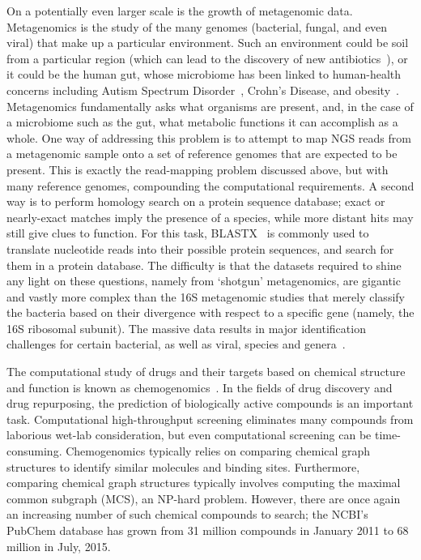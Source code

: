 \documentclass{acm_proc_article-sp}
\begin{document}
On a potentially even larger scale is the growth of metagenomic data.
Metagenomics is the study of the many genomes (bacterial, fungal, and even 
viral) that make up a particular environment.
Such an environment could be soil from a particular region (which can lead to 
the discovery of new 
antibiotics~\cite{forsberg2012shared}), or it could be 
the human gut, whose microbiome has been linked to human-health concerns 
including Autism Spectrum Disorder~\cite{macfabe2012short}, 
Crohn's Disease, and 
obesity~\cite{kostic2014microbiome}.
Metagenomics fundamentally asks what organisms are present, and, in the case
of a microbiome such as the gut, what metabolic functions it can accomplish as
a whole.
One way of addressing this problem is to attempt to map NGS reads from a metagenomic sample
onto a set of reference genomes that are expected to be present.
This is exactly the read-mapping problem discussed above, but with many 
reference genomes, compounding the computational requirements.
A second way is to perform homology search on a protein sequence database;
exact or nearly-exact matches imply the presence of a species, while more 
distant hits may still give clues to function.
For this task, BLASTX~\cite{altschul1990basic} is commonly
used to translate nucleotide reads into their possible protein sequences, and
search for them in a protein database.
The difficulty is that the datasets required to shine any light on these 
questions, namely from `shotgun' metagenomics, are gigantic and vastly more 
complex than the 16S metagenomic studies that merely classify the bacteria 
based on 
their divergence with respect to a specific gene (namely, the 16S ribosomal 
subunit).
The massive data results in major identification 
challenges for certain bacterial, as well as viral, species and 
genera~\cite{janda200716s}. 

The computational study of drugs and their targets based on chemical structure and function
is known as chemogenomics~\cite{bredel2004chemogenomics}.
In the fields of drug discovery and drug repurposing, the prediction 
of biologically active compounds is an important task. 
Computational high-throughput screening eliminates many compounds from 
laborious wet-lab consideration, but even computational screening can be 
time-consuming.
Chemogenomics typically relies on comparing chemical graph structures to identify
similar molecules and binding sites.
Furthermore, comparing chemical graph structures typically involves computing
the maximal common subgraph (MCS), an NP-hard problem.
However, there are once again an increasing number of such chemical compounds
to search; the NCBI's PubChem database has grown from 31 million compounds in
January 2011 to 68 million in July, 2015.
\end{document}
